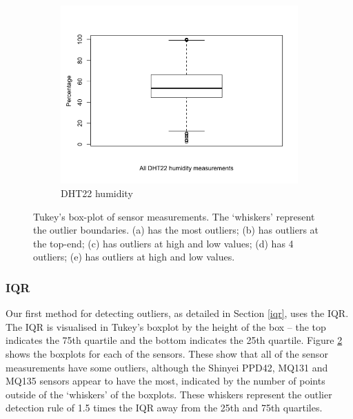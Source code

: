 \documentclass[11pt]{report}
\begin{document}
\begin{figure}[!tb]
    \begin{minipage}{1\linewidth}
    	\centering
        \begin{subfigure}[t]{.5\linewidth}
            \includegraphics[width=\textwidth]{images/humidity_boxplot}
            \caption{DHT22 humidity}
            \label{fig:humidity_boxplot}
        \end{subfigure}
    \end{minipage}
    \caption[Tukey's boxplots.]{Tukey's box-plot of sensor measurements. The `whiskers' represent the outlier boundaries. (a) has the most outliers; (b) has outliers at the top-end; (c) has outliers at high and low values; (d) has 4 outliers; (e) has outliers at high and low values.}
    \label{tukey_boxplots}
\end{figure}


\subsubsection{IQR}

Our first method for detecting outliers, as detailed in Section \ref{iqr}, uses the IQR. The IQR is visualised in Tukey's boxplot by the height of the box -- the top indicates the 75th quartile and the bottom indicates the 25th quartile. Figure \ref{tukey_boxplots} shows the boxplots for each of the sensors. These show that all of the sensor measurements have some outliers, although the Shinyei PPD42, MQ131 and MQ135 sensors appear to have the most, indicated by the number of points outside of the `whiskers' of the boxplots. These whiskers represent the outlier detection rule of 1.5 times the IQR away from the 25th and 75th quartiles.
\end{document}
